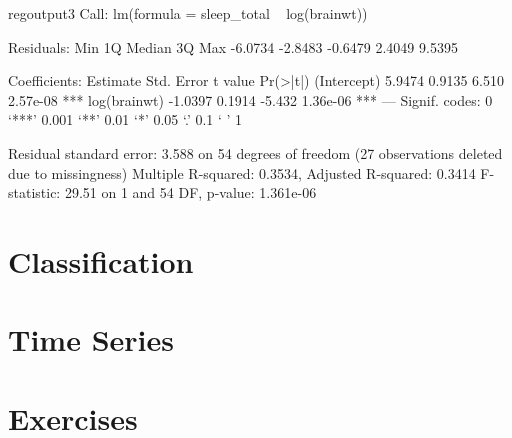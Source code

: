 \begin{SaveVerbatim}{regoutput3}
Call:
lm(formula = sleep_total ~ log(brainwt))

Residuals:
    Min      1Q  Median      3Q     Max 
-6.0734 -2.8483 -0.6479  2.4049  9.5395 

Coefficients:
             Estimate Std. Error t value Pr(>|t|)    
(Intercept)    5.9474     0.9135   6.510 2.57e-08 ***
log(brainwt)  -1.0397     0.1914  -5.432 1.36e-06 ***
---
Signif. codes:  0 ‘***’ 0.001 ‘**’ 0.01 ‘*’ 0.05 ‘.’ 0.1 ‘ ’ 1

Residual standard error: 3.588 on 54 degrees of freedom
  (27 observations deleted due to missingness)
Multiple R-squared:  0.3534,	Adjusted R-squared:  0.3414 
F-statistic: 29.51 on 1 and 54 DF,  p-value: 1.361e-06
\end{SaveVerbatim}

\begin{figure}
\end{figure}


\section{Classification}

\section{Time Series}

\section{Exercises}

